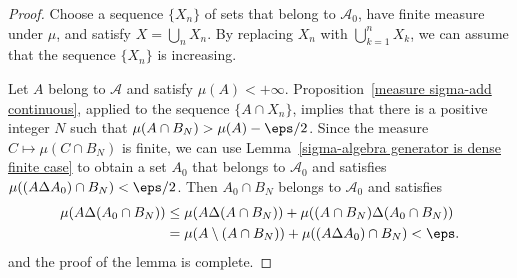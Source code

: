 \begin{proof}
Choose a sequence $\{X_n\}$ of sets that belong to $\mathcal{A}_0$, have finite measure under $\mu$, and satisfy $X=\bigcup_nX_n$. By replacing $X_n$ with $\bigcup_{k=1}^{n}X_k$, we can assume that the sequence $\{X_n\}$ is increasing.\par
Let $A$ belong to $\mathcal{A}$ and satisfy $\mu(A)<+\infty$. Proposition~\ref{measure sigma-add continuous}, applied to the sequence $\{A\cap X_n\}$, implies that there is a positive integer $N$ such that $\mu(A\cap B_N)>\mu(A)-\eps/2$. Since the measure $C\mapsto\mu(C\cap B_N)$ is finite, we can use Lemma~\ref{sigma-algebra generator is dense finite case} to obtain a set $A_0$ that belongs to $\mathcal{A}_0$ and satisfies $\mu((A\Delta A_0)\cap B_N)<\eps/2$. Then $A_0\cap B_N$ belongs to $\mathcal{A}_0$ and satisfies
\begin{align*}
\mu(A\Delta(A_0\cap B_N))&\leq\mu(A\Delta(A\cap B_N))+\mu((A\cap B_N)\Delta(A_0\cap B_N))\\
&=\mu(A\setminus(A\cap B_N))+\mu((A\Delta A_0)\cap B_N)<\eps.
\end{align*}
and the proof of the lemma is complete.
\end{proof}
